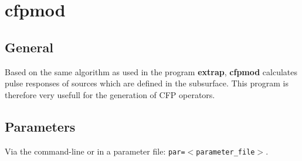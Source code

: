 \newpage
\section{\label{cfpmod}cfpmod}

\subsection{General}

Based on the same algorithm as used in the program {\bf extrap}, {\bf cfpmod} calculates pulse responses of sources which are defined in the subsurface. This program is therefore very usefull for the generation of CFP operators. 
\subsection{Parameters}

Via the command-line or in a parameter file: {\tt par=$<$parameter\_file$>$}.

